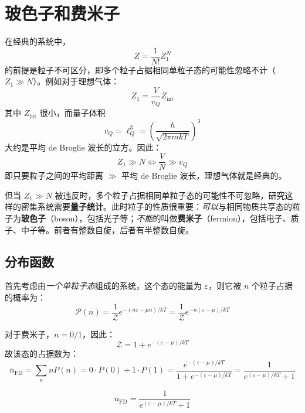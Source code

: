 \section{玻色子和费米子}
在经典的系统中，
\begin{equation}
Z=\frac{1}{N!}Z_1^N
\end{equation}
的前提是粒子不可区分，即多个粒子占据相同单粒子态的可能性忽略不计（$Z_1\gg N$）。例如对于理想气体：
\begin{equation}
Z_1=\frac{V}{v_Q}Z_{\mathrm{int}}
\end{equation}
其中 $Z_\mathrm{int}$ 很小，而量子体积
\begin{equation}
    v_Q=\ell_Q^3=\left(\frac{h}{\sqrt{2\pi mkT}}\right)^3
\end{equation}
大约是平均 de Broglie 波长的立方。因此：
\begin{equation}
Z_1\gg N
\iff
\frac{V}{N}\gg v_Q
\end{equation}
即只要粒子之间的平均距离 $\gg$ 平均 de Broglie 波长，理想气体就是经典的。

但当 $Z_1\gg N$ 被违反时，多个粒子占据相同单粒子态的可能性不可忽略，研究这样的密集系统需要\textbf{量子统计}。此时粒子的性质很重要：\textit{可以}与相同物质共享态的粒子为\textbf{玻色子}（boson），包括光子等；\textit{不能}的叫做\textbf{费米子}（fermion），包括电子、质子、中子等。前者有整数自旋，后者有半整数自旋。

\subsection{分布函数}
首先考虑由\textit{一个单粒子态}组成的系统，这个态的能量为 $\varepsilon$，则它被 $n$ 个粒子占据的概率为：
\begin{equation}
    \mathcal{P}(n)=\frac{1}{\mathcal{Z}}e^{-(n\varepsilon-\mu n)/kT} = \frac{1}{\mathcal{Z}}e^{-n(\varepsilon-\mu)/kT} 
\end{equation}

对于费米子，$n=0/1$，因此：
\begin{equation}
    \mathcal{Z}=1+e^{-(\varepsilon-\mu)/kT}
\end{equation}
故该态的占据数为：
\begin{equation}
    \overline n_{\mathrm{FD}}
    =\sum_n nP(n)=0\cdot P(0)+1\cdot P(1)
    =\frac{e^{-(\varepsilon-\mu)/kT}}{1+e^{-(\varepsilon-\mu)/kT}}
    =\frac{1}{e^{(\varepsilon-\mu)/kT}+1}
\end{equation}
\begin{definition}
    \begin{equation}
        \overline n_{\mathrm{FD}} = \frac{1}{e^{(\varepsilon-\mu)/kT}+1}
    \end{equation}
\end{definition}

